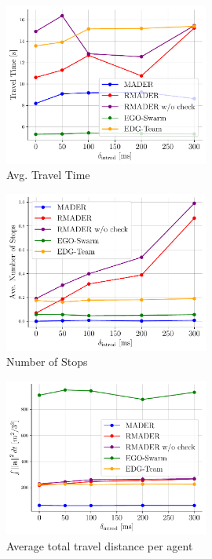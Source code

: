 \begin{figure}
    \centering
    \includegraphics[width=0.6\textwidth]{figures/travel_time.pdf}
    \caption{\centering Avg. Travel Time}
    \label{fig:sim_travel_time}
\end{figure}

\begin{figure}
    \centering
    \includegraphics[width=0.6\textwidth]{figures/stop.pdf}
    \caption{\centering Number of Stops}
    \label{fig:sim_stop}
\end{figure}

\begin{figure}
    \centering
    \includegraphics[width=0.6\textwidth]{figures/traj_smoothness_acc.pdf}
    \caption{\centering Average total travel distance per agent}
    \label{fig:traj_smoothness_acc}
\end{figure}

